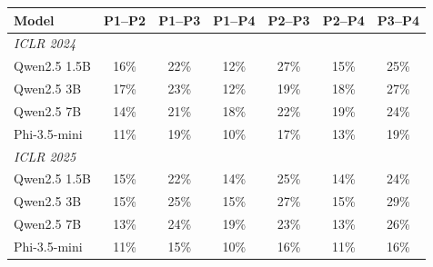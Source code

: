\begin{tabular}{lcccccc}
\toprule
\textbf{Model} & \textbf{P1--P2} & \textbf{P1--P3} & \textbf{P1--P4} & \textbf{P2--P3} & \textbf{P2--P4} & \textbf{P3--P4} \\
\midrule
\multicolumn{7}{l}{\textit{ICLR 2024}} \\
Qwen2.5 1.5B & 16\% & 22\% & 12\% & 27\% & 15\% & 25\% \\
Qwen2.5 3B & 17\% & 23\% & 12\% & 19\% & 18\% & 27\% \\
Qwen2.5 7B & 14\% & 21\% & 18\% & 22\% & 19\% & 24\% \\
Phi-3.5-mini & 11\% & 19\% & 10\% & 17\% & 13\% & 19\% \\
\midrule
\multicolumn{7}{l}{\textit{ICLR 2025}} \\
Qwen2.5 1.5B & 15\% & 22\% & 14\% & 25\% & 14\% & 24\% \\
Qwen2.5 3B & 15\% & 25\% & 15\% & 27\% & 15\% & 29\% \\
Qwen2.5 7B & 13\% & 24\% & 19\% & 23\% & 13\% & 26\% \\
Phi-3.5-mini & 11\% & 15\% & 10\% & 16\% & 11\% & 16\% \\
\bottomrule
\end{tabular}
